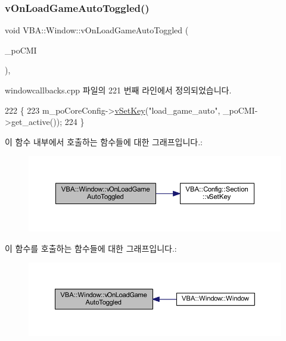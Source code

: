 \subsubsection{\texorpdfstring{v\+On\+Load\+Game\+Auto\+Toggled()}{vOnLoadGameAutoToggled()}}
{\footnotesize\ttfamily void V\+B\+A\+::\+Window\+::v\+On\+Load\+Game\+Auto\+Toggled (\begin{DoxyParamCaption}\item[{Gtk\+::\+Check\+Menu\+Item $\ast$}]{\+\_\+po\+C\+MI }\end{DoxyParamCaption})\hspace{0.3cm}{\ttfamily [protected]}, {\ttfamily [virtual]}}



windowcallbacks.\+cpp 파일의 221 번째 라인에서 정의되었습니다.


\begin{DoxyCode}
222 \{
223   m\_poCoreConfig->\mbox{\hyperlink{class_v_b_a_1_1_config_1_1_section_a57e1b95cbea40db71c093381beff4b0e}{vSetKey}}(\textcolor{stringliteral}{"load\_game\_auto"}, \_poCMI->get\_active());
224 \}
\end{DoxyCode}
이 함수 내부에서 호출하는 함수들에 대한 그래프입니다.\+:
\nopagebreak
\begin{figure}[H]
\begin{center}
\leavevmode
\includegraphics[width=350pt]{class_v_b_a_1_1_window_a9457e3b8fe1022c96a548e1169002f0c_cgraph}
\end{center}
\end{figure}
이 함수를 호출하는 함수들에 대한 그래프입니다.\+:
\nopagebreak
\begin{figure}[H]
\begin{center}
\leavevmode
\includegraphics[width=350pt]{class_v_b_a_1_1_window_a9457e3b8fe1022c96a548e1169002f0c_icgraph}
\end{center}
\end{figure}
\mbox{\label{class_v_b_a_1_1_window_ac73a836767434700186832ae1ea49cc5}} 
